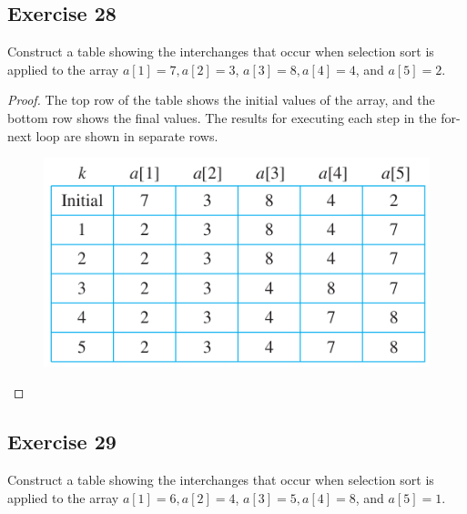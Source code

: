 \documentclass[14pt]{extarticle}
\begin{document}
\subsection{Exercise 28}
Construct a table showing the interchanges that occur when selection sort is applied to the array \(a[1] = 7, a[2] = 3\),
\(a[3] = 8, a[4] = 4\), and \(a[5] = 2\).

\begin{proof}
    The top row of the table shows the initial values of the array, and the bottom row shows the final values. The results
    for executing each step in the for-next loop are shown in separate rows.

    \begin{figure}[ht!]
        \centering
        \includegraphics[scale=0.6]{../images/11.3.28.png}
    \end{figure}
\end{proof}

\subsection{Exercise 29}
Construct a table showing the interchanges that occur when selection sort is applied to the array \(a[1] = 6, a[2] = 4\),
\(a[3] = 5, a[4] = 8\), and \(a[5] = 1\).
\end{document}
